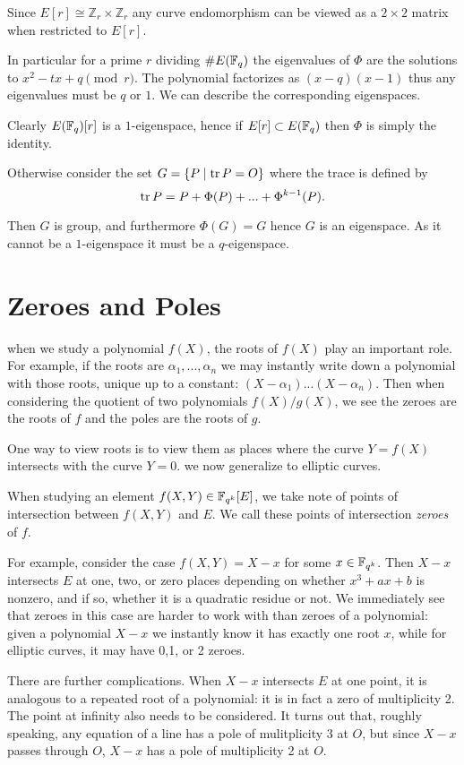 Since $E[r] \cong \mathbb{Z}_r \times \mathbb{Z}_r$ any curve endomorphism
can be viewed as a $2\times 2$ matrix when restricted to $E[r]$.

In particular for a prime $r$ dividing $\#E(\mathbb{F}_q)$ the eigenvalues
of $\Phi$ are the solutions to $x^2 - t x + q \pmod{r}$.
The polynomial factorizes as $(x - q)(x - 1)$ thus any eigenvalues
must be $q$ or $1$. We can describe the corresponding eigenspaces.

Clearly $E(\mathbb{F}_q)[r]$ is a $1$-eigenspace, hence if $E[r] \subset E(\mathbb{F}_q)$
then $\Phi$ is simply the identity.

Otherwise consider the set $G = \{P \mid \mathop{\rm tr} P = O \}$
where the trace is defined by
\[ \mathop{\rm tr} P = P + \Phi(P) + ... + \Phi^{k-1}(P)  .\]

Then $G$ is group, and furthermore $\Phi(G) = G$ hence $G$ is an eigenspace.
As it cannot be a $1$-eigenspace it must be a $q$-eigenspace.

\section {Zeroes and Poles}

when we study a polynomial $f(X)$, the roots of $f(X)$ play an important
role. For example, if the roots are $\alpha_1,...,\alpha_n$ we may
instantly write down a polynomial with those roots, unique up to a constant:
$(X-\alpha_1)...(X-\alpha_n)$. Then when considering the quotient of
two polynomials $f(X)/g(X)$, we see the zeroes are the roots of $f$ and
the poles are the roots of $g$.

One way to view roots is to view them as places where the curve $Y = f(X)$
intersects with the curve $Y = 0$. we now generalize to elliptic curves.

When studying an element $f(X,Y) \in \mathbb{F}_{q^k}[E]$, we take note of points of
intersection between $f(X,Y)$ and $E$.
We call these points of intersection \emph{zeroes} of $f$.

For example, consider the case $f(X,Y) = X-x$ for some $x\in\mathbb{F}_{q^k}$.
Then $X-x$ intersects $E$ at one, two, or zero places depending
on whether $x^3 + a x + b$ is nonzero, and if so, whether it is a quadratic
residue or not.
We immediately see that zeroes in this case are harder to work with than
zeroes of a polynomial: given a polynomial $X - x$ we instantly know it has
exactly one root $x$, while for elliptic curves, it may have 0,1, or 2
zeroes.

There are further complications. When $X - x$ intersects $E$ at one point,
it is analogous to a repeated root of a polynomial: it is in
fact a zero of multiplicity 2. The point at infinity also needs to be
considered. It turns out that, roughly speaking, any equation of a line
has a pole of mulitplicity 3 at $O$, but since $X - x$ passes through $O$,
$X-x$ has a pole of multiplicity 2 at $O$.

